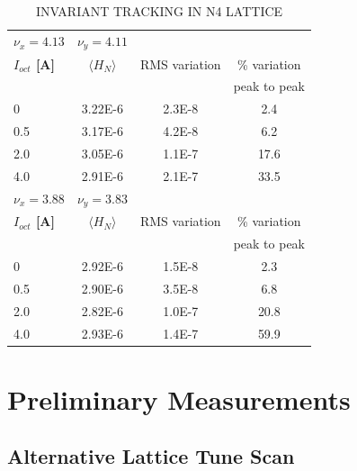 \begin{table}[hbt]
   \centering
   \caption{INVARIANT TRACKING IN N4 LATTICE}
   \begin{tabular}{lccc}
       \toprule
	   $\nu_x=4.13$ & $\nu_y=4.11$\\
       \textbf{$I_{oct}$ [A]} & \textbf{$\langle H_N \rangle$}        &RMS variation             & \% variation  \\
	   & & & peak to peak\\
       \midrule
           0        & 3.22E-6    &2.3E-8      & 2.4       \\ %
          0.5       & 3.17E-6     &4.2E-8     & 6.2       \\ %
           2.0        & 3.05E-6    &1.1E-7     &17.6       \\ %
           4.0      & 2.91E-6      &2.1E-7   & 33.5        \\
       \bottomrule
       \toprule
	   $\nu_x=3.88$ & $\nu_y=3.83$\\
       \textbf{$I_{oct}$ [A]} & \textbf{$\langle H_N \rangle$}          &RMS variation          & \% variation \\
		& & & peak to peak\\
       \midrule
           0        & 2.92E-6      &1.5E-8    & 2.3       \\ %
          0.5       & 2.90E-6      &3.5E-8    & 6.8       \\ %
           2.0        & 2.82E-6     & 1.0E-7    & 20.8       \\ %
           4.0      & 2.93E-6       & 1.4E-7   & 59.9        \\
       \bottomrule

   \end{tabular}
   \label{l2ea4-t1}
\end{table}


\section{Preliminary Measurements}

\subsection{Alternative Lattice Tune Scan}

